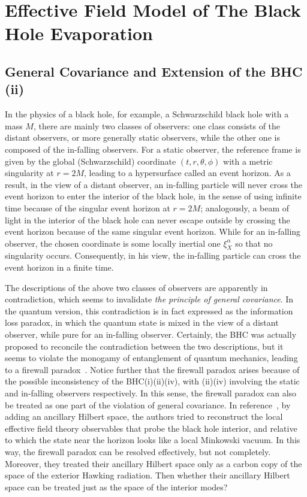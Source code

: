 \documentclass[12pt,a4paper]{article}
\begin{document}
\section{Effective Field Model of The Black Hole Evaporation}
\label{sec:Model}

\subsection{General Covariance and Extension of the BHC (ii)}
\label{sec:bhc}

In the physics of a black hole, for example, a Schwarzschild black hole with a mass $M$, there are mainly two classes of observers: one class consists of the distant observers, or more generally static observers, while the other one is composed of the in-falling observers. For a static observer, the reference frame is given by the global (Schwarzschild) coordinate $(t,r,\theta,\phi)$ with a metric singularity at $r=2M$, leading to a hypersurface called an event horizon. As a result, in the view of a distant observer, an in-falling particle will never cross the event horizon to enter the interior of the black hole, in the sense of using infinite time because of the singular event horizon at $r=2M$; analogously, a beam of light in the interior of the black hole can never escape outside by crossing the event horizon because of the same singular event horizon. While for an in-falling observer, the chosen coordinate is some locally inertial one $\xi^{\alpha}_{X}$ so that no singularity occurs. Consequently, in his view, the in-falling particle can cross the event horizon in a finite time.

The descriptions of the above two classes of observers are apparently in contradiction, which seems to invalidate \emph{the principle of general covariance}. In the quantum version, this contradiction is in fact expressed as the information loss paradox, in which the quantum state is mixed in the view of a distant observer, while pure for an in-falling observer. Certainly, the BHC was actually proposed to reconcile the contradiction between the two descriptions, but it seems to violate the monogamy of entanglement
of quantum mechanics, leading to a firewall paradox~\cite{d}. Notice further that the firewall paradox arises because of the possible inconsistency of the BHC(i)(ii)(iv), with (ii)(iv) involving the static and in-falling observers respectively. In this sense, the firewall paradox can also be treated as one part of the violation of general covariance. In reference~\cite{h}, by adding an ancillary Hilbert space, the authors tried to reconstruct the local effective field theory observables that probe the black hole interior, and relative to which the state near the horizon looks like a local Minkowski vacuum. In this way, the firewall paradox can be resolved effectively, but not completely. Moreover, they treated their ancillary Hilbert space only as a carbon copy of the space of the exterior Hawking radiation. Then whether their ancillary Hilbert space can be treated just as the space of the interior modes?
\end{document}
